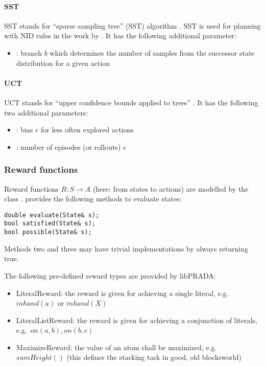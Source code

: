 \documentclass[10pt,twoside,twocolumn,fleqn]{article}
\begin{document}
\paragraph{SST}

SST stands for ``sparse sampling tree'' (SST) algorithm
\citep{kearns02ss}. SST is used for planning with NID rules in the work by
\cite{pasula07ai}. It has the following additional parameter:
\begin{itemize}
\item {}: branch $b$ which determines the number of samples from
the successor state distribution for a given action
\end{itemize}


\paragraph{UCT}

UCT stands for ``upper confidence bounds applied to trees''
\citep{kocsis06uct}.
It has the following two additional parameters:
\begin{itemize}
\item {}: bias $c$ for less often explored actions
\item {}: number of episodes (or rollouts) $e$
\end{itemize}



\subsubsection{Reward functions}

Reward functions $R: S \to A$ (here: from states to actions) are modelled
by the class .  provides the following methods to
evaluate states:
\begin{lstlisting}
double evaluate(State& s);
bool satisfied(State& s);
bool possible(State& s);
\end{lstlisting}
Methods two and three may have trivial implementations by always returning
true.

The following pre-defined reward types are provided by libPRADA:
\begin{itemize}
\item LiteralReward: the reward is given for achieving a single literal,
e.g.~$inhand(a)$ or $inhand(X)$
\item LiteralListReward: the reward is given for achieving a conjunction
of literals, e.g.~$on(a,b), on(b,c)$
\item MaximizeReward: the value of an atom shall be maximized,
e.g.~$sumHeight()$ (this defines the stacking task in good, old
blocksworld)
\end{itemize}
\end{document}
